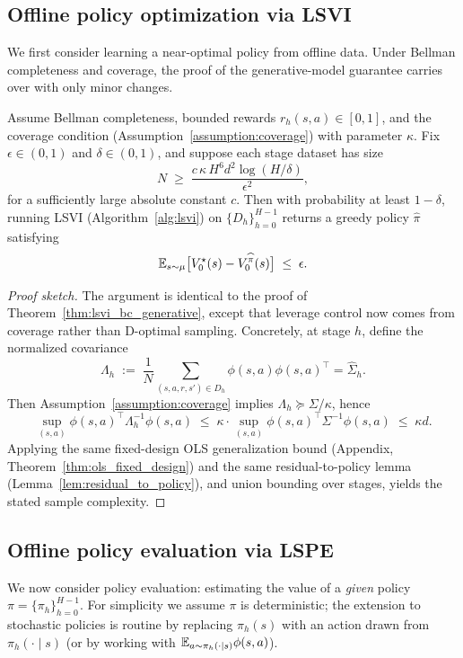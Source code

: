 \subsection{Offline policy optimization via LSVI}
\label{subsec:BC_offline_lsvi}

We first consider learning a near-optimal policy from offline data. Under Bellman
completeness and coverage, the proof of the
generative-model guarantee carries over with only minor changes.

\begin{theorem}\label{thm:lsvi_bc_offline}
Assume Bellman completeness, bounded rewards
$r_h(s,a)\in[0,1]$, and the coverage condition
(Assumption~\ref{assumption:coverage}) with parameter $\kappa$.
Fix $\epsilon\in(0,1)$ and $\delta\in(0,1)$, and suppose each stage dataset has size
\[
N \;\ge\; \frac{c\,\kappa\,H^6 d^2 \log(H/\delta)}{\epsilon^2},
\]
for a sufficiently large absolute constant $c$.
Then with probability at least $1-\delta$, running LSVI (Algorithm~\ref{alg:lsvi})
on $\{D_h\}_{h=0}^{H-1}$ returns a greedy policy $\widehat\pi$ satisfying
\[
\mathbb{E}_{s\sim\mu}\big[V_0^\star(s) - V_0^{\widehat\pi}(s)\big] \;\le\; \epsilon.
\]
\end{theorem}

\begin{proof}[Proof sketch]
The argument is identical to the proof of Theorem~\ref{thm:lsvi_bc_generative},
except that leverage control now comes from coverage rather than D-optimal sampling.
Concretely, at stage $h$, define the normalized covariance
\[
\Lambda_h
\;:=\;
\frac{1}{N}\sum_{(s,a,r,s')\in D_h}\phi(s,a)\phi(s,a)^\top
=
\widehat\Sigma_h.
\]
Then Assumption~\ref{assumption:coverage} implies $\Lambda_h\succeq \Sigma/\kappa$, hence
\[
\sup_{(s,a)}\phi(s,a)^\top\Lambda_h^{-1}\phi(s,a)
\;\le\;
\kappa\cdot \sup_{(s,a)}\phi(s,a)^\top\Sigma^{-1}\phi(s,a)
\;\le\;
\kappa d.
\]
Applying the same fixed-design OLS generalization bound (Appendix,
Theorem~\ref{thm:ols_fixed_design}) and the same residual-to-policy lemma
(Lemma~\ref{lem:residual_to_policy}), and union bounding over stages, yields the stated
sample complexity.
\end{proof}

\subsection{Offline policy evaluation via LSPE}
\label{subsec:BC_offline_lspe}

We now consider policy evaluation: estimating the value of a \emph{given} policy
$\pi=\{\pi_h\}_{h=0}^{H-1}$. For simplicity we assume $\pi$ is deterministic; the
extension to stochastic policies is routine by replacing $\pi_h(s)$ with an action
drawn from $\pi_h(\cdot\mid s)$ (or by working with $\mathbb{E}_{a\sim\pi_h(\cdot\mid s)}\phi(s,a)$).

